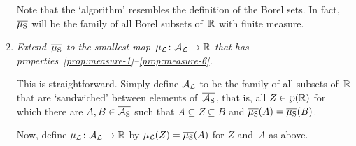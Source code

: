 \begin{enumerate}
Note that the `algorithm' resembles the  definition
of the Borel sets.
In fact, $\overline{\mu_{\mathrm{S}}}$
will be the family of all Borel subsets of~$\mathbb{R}$
with finite measure.


\item
\label{extension-step-3}
\emph{Extend~$\overline{\mu_{\mathrm{S}}}$
to the smallest map~$\mu_{\mathcal{L}}\colon \mathcal{A}_{\mathcal{L}} \rightarrow \mathbb{R}$
that has properties~\ref{prop:measure-1}--\ref{prop:measure-6}.}

This is straightforward.
Simply
define $\mathcal{A}_{\mathcal{L}}$ to be the family of all subsets of~$\mathbb{R}$
that are `sandwiched' between elements of~$\overline{\mathcal{A}_{\mathrm{S}}}$,
that is,
all $Z\in\wp(\mathbb{R})$
for which
there are $A,B\in \overline{\mathcal{A}_{\mathrm{S}}}$
such that $A\subseteq Z\subseteq B$ and 
$\overline{\mu_{\mathrm{S}}}(A) = \overline{\mu_{\mathrm{S}}}(B)$.

Now, define $\mu_{\mathcal{L}}\colon \mathcal{A}_{\mathcal{L}} \rightarrow \mathbb{R}$
by $\mu_{\mathcal{L}} (Z) = \overline{\mu_{\mathrm{S}}} (A)$ for $Z$ and~$A$ as above.
\end{enumerate}

